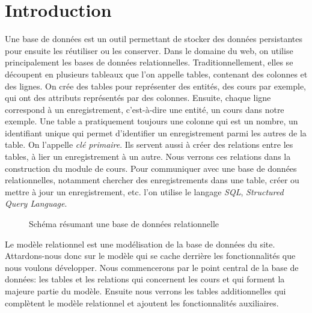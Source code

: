\documentclass[letterpaper,10pt,oneside]{sphinxmanual}
\begin{document}
\section{Introduction}
\label{models:introduction}
Une base de données est un outil permettant de stocker des données persistantes pour ensuite les réutiliser ou les conserver. Dans le domaine du web, on utilise principalement les bases de données relationnelles. Traditionnellement, elles se découpent en plusieurs tableaux que l'on appelle tables, contenant des colonnes et des lignes. On crée des tables pour représenter des entités, des cours par exemple, qui ont des attributs représentés par des colonnes. Ensuite, chaque ligne correspond à un enregistrement, c'est-à-dire une entité, un cours dans notre exemple. Une table a pratiquement toujours une colonne  qui est un nombre, un identifiant unique qui permet d'identifier un enregistrement parmi les autres de la table. On l'appelle \emph{clé primaire}. Ils servent aussi à créer des relations entre les tables, à lier un enregistrement à un autre. Nous verrons ces relations dans la construction du module de cours. Pour communiquer avec une base de données relationnelles, notamment chercher des enregistrements dans une table, créer ou mettre à jour un enregistrement, etc. l'on utilise le langage \emph{SQL}, \emph{Structured Query Language}.
\begin{figure}[htbp]
\centering
\capstart

\caption{Schéma résumant une base de données relationnelle}\end{figure}

Le modèle relationnel est une modélisation de la base de données du site. Attardons-nous donc sur le modèle qui se cache derrière les fonctionnalités que nous voulons développer. Nous commencerons par le point central de la base de données: les tables et les relations qui concernent les cours et qui forment la majeure partie du modèle. Ensuite nous verrons les tables additionnelles qui complètent le modèle relationnel et ajoutent les fonctionnalités auxiliaires.
\end{document}
